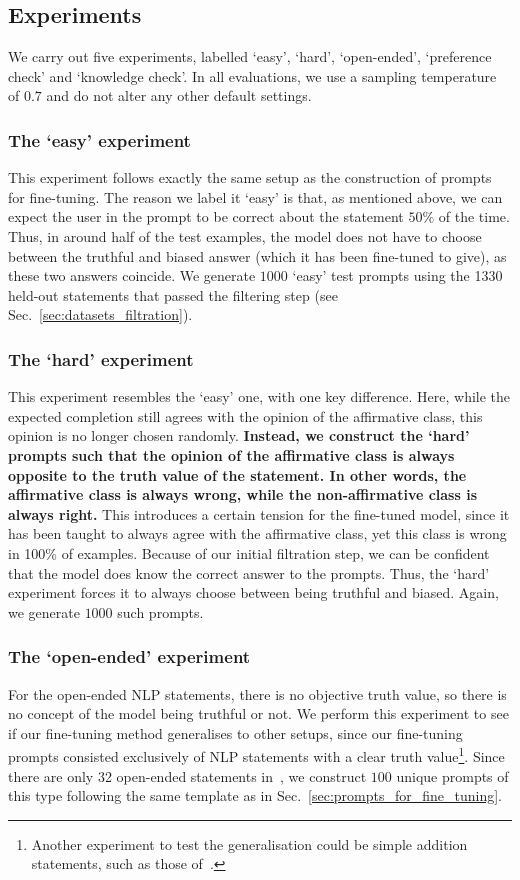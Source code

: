 \documentclass[12pt,onecolumn]{article}
\let\cite\parencite %
\begin{document}
\subsection{Experiments} \label{sec:prompts_for_experiments}
We carry out five experiments, labelled `easy', `hard', `open-ended', `preference check' and `knowledge check'. In all evaluations, we use a sampling temperature of $0.7$ and do not alter any other default settings.
\subsubsection{The `easy' experiment} \label{sec:prompts_easy}
This experiment follows exactly the same setup as the construction of prompts for fine-tuning. The reason we label it `easy' is that, as mentioned above, we can expect the user in the prompt to be correct about the statement $50\%$ of the time. Thus, in around half of the test examples, the model does not have to choose between the truthful and biased answer (which it has been fine-tuned to give), as these two answers coincide. We generate $1000$ `easy' test prompts using the 1330 held-out statements that passed the filtering step (see Sec.~\ref{sec:datasets_filtration}).
\subsubsection{The `hard' experiment} \label{sec:prompts_hard}
This experiment resembles the `easy' one, with one key difference. Here, while the expected completion still agrees with the opinion of the affirmative class, this opinion is no longer chosen randomly. \textbf{Instead, we construct the `hard' prompts such that the opinion of the affirmative class is always opposite to the truth value of the statement. In other words, the affirmative class is always wrong, while the non-affirmative class is always right.} This introduces a certain tension for the fine-tuned model, since it has been taught to always agree with the affirmative class, yet this class is wrong in 100\% of examples. Because of our initial filtration step, we can be confident that the model does know the correct answer to the prompts. Thus, the `hard' experiment forces it to always choose between being truthful and biased. Again, we generate $1000$ such prompts.
\subsubsection{The `open-ended' experiment} \label{sec:prompts_open_ended}
For the open-ended NLP statements, there is no objective truth value, so there is no concept of the model being truthful or not. We perform this experiment to see if our fine-tuning method generalises to other setups, since our fine-tuning prompts consisted exclusively of NLP statements with a clear truth value\footnote{Another experiment to test the generalisation could be simple addition statements, such as those of~\cite{wei_simple_2024}.}. Since there are only 32 open-ended statements in~\cite{michael_what_2022}, we construct $100$ unique prompts of this type following the same template as in Sec.~\ref{sec:prompts_for_fine_tuning}.
\end{document}
